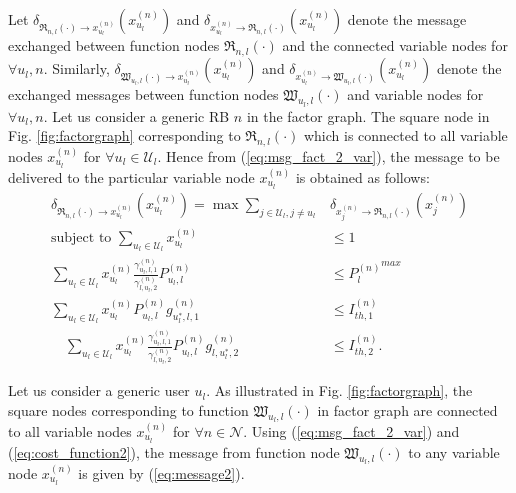 \documentclass[twocolumn,10pt]{IEEEtran}
\begin{document}
Let $\delta_{\mathfrak{R}_{n,l}(\cdot) \rightarrow x_{u_l}^{(n)}} \left( x_{u_l}^{(n)} \right)$  and $\delta_{x_{u_l}^{(n)} \rightarrow \mathfrak{R}_{n,l}(\cdot)} \left( x_{u_l}^{(n)} \right) $ denote
the message exchanged between  function nodes $\mathfrak{R}_{n,l}(\cdot)$ and the connected variable nodes for $\forall u_l, n$. Similarly, $ \delta_{\mathfrak{W}_{u_l, l}(\cdot)  \rightarrow x_{u_l}^{(n)}} \left( x_{u_l}^{(n)} \right) $
and $\delta_{x_{u_l}^{(n)} \rightarrow \mathfrak{W}_{u_l, l}(\cdot)} \left( x_{u_l}^{(n)} \right)$ denote the  exchanged messages between  function nodes $ \mathfrak{W}_{u_l, l}(\cdot) $ and variable nodes for $\forall u_l, n$. Let us consider a generic RB $n$ in the factor graph. The square node in Fig. \ref{fig:factorgraph} corresponding  to $\mathfrak{R}_{n,l}(\cdot)$ which is connected to all variable nodes $x_{u_l}^{(n)}$ for $\forall u_l \in \mathcal{U}_l$. Hence from (\ref{eq:msg_fact_2_var}), the message to be delivered to the particular variable node $x_{u_l}^{(n)}$ is obtained as follows:
\begin{align} \label{eq:message1}
\delta_{\mathfrak{R}_{n,l}(\cdot) \rightarrow x_{u_l}^{(n)}} \left( x_{u_l}^{(n)} \right) =  \max \sum_{j \in \mathcal{U}_l, j \neq u_l } & \delta_{x_{j}^{(n)} \rightarrow \mathfrak{R}_{n,l}(\cdot)  } \left( x_{j}^{(n)} \right) \nonumber \\
\text{subject to } 
\displaystyle \sum_{u_l \in \mathcal{U}_l} x_{u_l}^{(n)} & \leq 1 \nonumber  \\
\displaystyle \sum_{u_l \in \mathcal{U}_l }  x_{u_l}^{(n)} \tfrac{\gamma_{u_l, l, 1}^{(n)}}{\gamma_{l, u_l, 2}^{(n)}} P_{u_l, l}^{(n)} & \leq  {P_l^{(n)}}^{max} \nonumber  \\
\displaystyle  \sum_{u_l \in \mathcal{U}_l } x_{u_l}^{(n)} P_{u_l, l}^{(n)} g_{{u_l^*}, l, 1}^{(n)}  &\leq I_{th, 1}^{(n)} \nonumber  \\
\displaystyle  \quad \sum_{u_l \in \mathcal{U}_l } x_{u_l}^{(n)}  \tfrac{\gamma_{u_l, l, 1}^{(n)}}{\gamma_{l, u_l, 2}^{(n)}} P_{u_l, l}^{(n)} g_{l, {u_l^*}, 2}^{(n)} & \leq I_{th, 2}^{(n)}.
\end{align}


Let us consider a generic user $u_l$. As illustrated in Fig. \ref{fig:factorgraph}, the square nodes corresponding to function $\mathfrak{W}_{u_l, l}(\cdot)$ in factor graph are connected to all variable nodes $x_{u_l}^{(n)}$ for $\forall n \in \mathcal{N}$. Using (\ref{eq:msg_fact_2_var}) and (\ref{eq:cost_function2}),  the message from  function node $\mathfrak{W}_{u_l, l}(\cdot)$ to any variable node $x_{u_l}^{(n)}$ is given by (\ref{eq:message2}).
\end{document}
